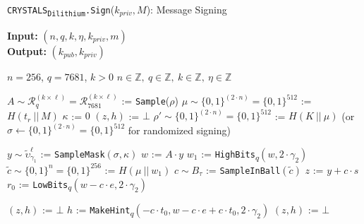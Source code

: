 \documentclass[runningheads]{llncs}
\numberwithin{equation}{section}
\begin{document}
    \begin{algorithm}
        \caption{\texorpdfstring{\texttt{CRYSTALS}\textsubscript{\texttt{Dilithium}}\texttt{.Sign}(${k}_{priv}, M$)}\/: Message Signing}
        \label{subrou:crystals-dilithium-sign}
        
        \textbf{Input:} $\left( n, q, k, \eta, {k}_{priv}, m \right)$\\
        \textbf{Output:} $ ( {k}_{pub}, {k}_{priv} ) $
    
        \begin{algorithmic}[1]
            \Require $n = 256$, $q = 7681$, $k > 0$
            \Ensure $n \in \mathbb{Z},\ q \in \mathbb{Z},\ k \in \mathbb{Z},\ \eta \in \mathbb{Z}$
            
            \vspace{2ex}
            
            \State $A \sim {\mathcal{R}}_{q}^{( k \times \ell )} = {\mathcal{R}}_{7681}^{( k \times \ell )}$ := \texttt{Sample}($\rho$)
            \State $\mu \sim { \{ 0 , 1 \} }^{( 2 \cdot n )} = { \{ 0 , 1 \} }^{512}$ := $H\left( {t}_{r}\ ||\ M \right)$
            \State $\kappa$ := $0$
            \State $(z, h)$ := $\bot$
            \State $\rho' \sim { \{ 0 , 1 \} }^{( 2 \cdot n )} = { \{ 0 , 1 \} }^{512}$ := $H\left( K\ ||\ \mu \right)$ (or $\sigma \gets { \{ 0 , 1 \} }^{( 2 \cdot n )} = { \{ 0 , 1 \} }^{512}$ 
            \Statex \hspace{43.25ex} for randomized signing)
            
            \vspace{1ex}

                \State $y \sim { \tilde{\upsilon} }_{ { \gamma }_{1} }^{\ell}$ := \texttt{SampleMask}$( \sigma, \kappa )$
                \State $w$ := $A \cdot y$
                \State ${w}_{1}$ := \texttt{HighBits}\textsubscript{$q$}$( w, 2 \cdot {\gamma}_{2} )$
                \State $\tilde{c} \sim { \{ 0 , 1 \} }^{n} = { \{ 0 , 1 \} }^{256}$ := $H\left( \mu\ ||\ {w}_{1} \right)$
                \State $c \sim {B}_{\tau}$ := \texttt{SampleInBall}$(\tilde{c})$
                \State $z$ := $y + c \cdot s$
                \State ${r}_{0}$ := \texttt{LowBits}\textsubscript{$q$}$( w - c \cdot e, 2 \cdot {\gamma}_{2} )$

                \vspace{1ex}

                    \State $(z, h)$ := $\bot$ 
                \Else
                    \State $h$ := \texttt{MakeHint}\textsubscript{$q$}$( -c \cdot {t}_{0}, w - c \cdot e + c \cdot {t}_{0}, 2 \cdot {\gamma}_{2} )$
                        \State $(z, h)$ := $\bot$ 
                    \EndIf
                \EndIf


\end{algorithmic}
\end{algorithm}
\end{document}
